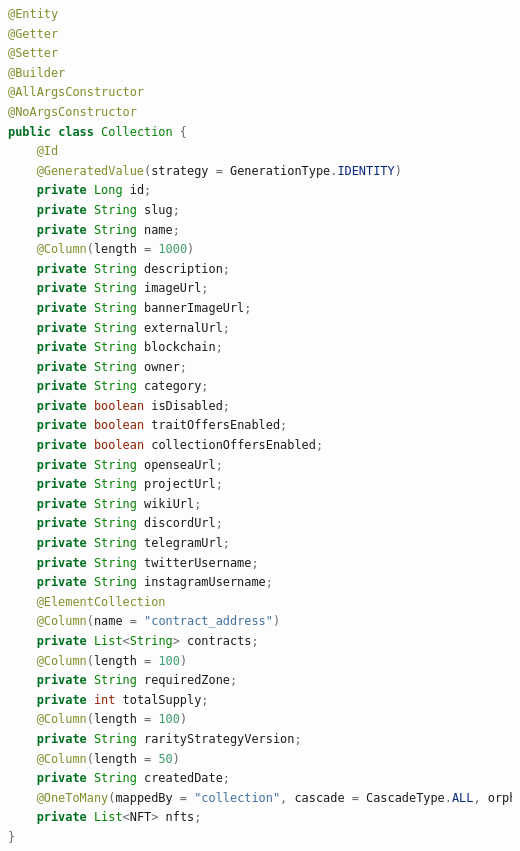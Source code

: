 \begin{itemize}
\begin{lstlisting}[language=Java, style=JavaStyle]
@Entity
@Getter
@Setter
@Builder
@AllArgsConstructor
@NoArgsConstructor
public class Collection {
	@Id
	@GeneratedValue(strategy = GenerationType.IDENTITY)
	private Long id;
	private String slug;
	private String name;
	@Column(length = 1000)
	private String description;
	private String imageUrl;
	private String bannerImageUrl;
	private String externalUrl;
	private String blockchain;
	private String owner;
	private String category;
	private boolean isDisabled;
	private boolean traitOffersEnabled;
	private boolean collectionOffersEnabled;
	private String openseaUrl;
	private String projectUrl;
	private String wikiUrl;
	private String discordUrl;
	private String telegramUrl;
	private String twitterUsername;
	private String instagramUsername;
	@ElementCollection
	@Column(name = "contract_address")
	private List<String> contracts;
	@Column(length = 100)
	private String requiredZone;
	private int totalSupply;
	@Column(length = 100)
	private String rarityStrategyVersion;
	@Column(length = 50)
	private String createdDate;
	@OneToMany(mappedBy = "collection", cascade = CascadeType.ALL, orphanRemoval = true)
	private List<NFT> nfts;
}
\end{lstlisting}

\end{itemize}

